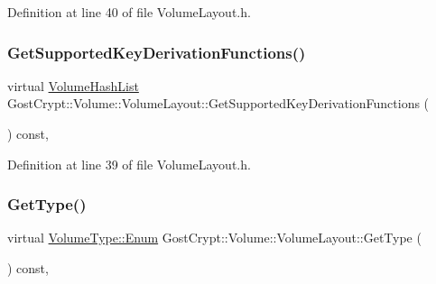 Definition at line 40 of file Volume\+Layout.\+h.

\mbox{\label{class_gost_crypt_1_1_volume_1_1_volume_layout_a4d61439dda6f363bf2ac1bd8bda7aaf3}} 
\subsubsection{\texorpdfstring{Get\+Supported\+Key\+Derivation\+Functions()}{GetSupportedKeyDerivationFunctions()}}
{\footnotesize\ttfamily virtual \hyperlink{namespace_gost_crypt_1_1_volume_a513257938e5ea0554ad83d0eb08f8f67}{Volume\+Hash\+List} Gost\+Crypt\+::\+Volume\+::\+Volume\+Layout\+::\+Get\+Supported\+Key\+Derivation\+Functions (\begin{DoxyParamCaption}{ }\end{DoxyParamCaption}) const\hspace{0.3cm}{\ttfamily [inline]}, {\ttfamily [virtual]}}



Definition at line 39 of file Volume\+Layout.\+h.

\mbox{\label{class_gost_crypt_1_1_volume_1_1_volume_layout_a86e831db4065d301328351507aca7eb0}} 
\subsubsection{\texorpdfstring{Get\+Type()}{GetType()}}
{\footnotesize\ttfamily virtual \hyperlink{struct_gost_crypt_1_1_volume_1_1_volume_type_a7fe1979dab76d4534dcb1e26179d4717}{Volume\+Type\+::\+Enum} Gost\+Crypt\+::\+Volume\+::\+Volume\+Layout\+::\+Get\+Type (\begin{DoxyParamCaption}{ }\end{DoxyParamCaption}) const\hspace{0.3cm}{\ttfamily [inline]}, {\ttfamily [virtual]}}



